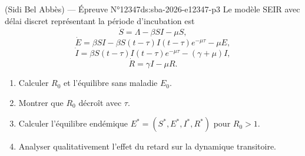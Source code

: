 \newpage
\begin{problem}{(Sidi Bel Abbès) — Épreuve N°12347}{ds:sba-2026-e12347-p3}
Le modèle SEIR avec délai discret représentant la période d’incubation est
$$
\dot S=\Lambda-\beta SI-\mu S,
$$
$$
\dot E=\beta SI-\beta S(t-\tau)I(t-\tau)e^{-\mu\tau}-\mu E,
$$
$$
\dot I=\beta S(t-\tau)I(t-\tau)e^{-\mu\tau}-(\gamma+\mu)I,
$$
$$
\dot R=\gamma I-\mu R.
$$
\begin{enumerate}
\item Calculer $R_0$ et l’équilibre sans maladie $E_0$.
\item Montrer que $R_0$ décroît avec $\tau$.
\item Calculer l’équilibre endémique $E^*=(S^*,E^*,I^*,R^*)$ pour $R_0>1$.
\item Analyser qualitativement l’effet du retard sur la dynamique transitoire.
\end{enumerate}
\end{problem}
